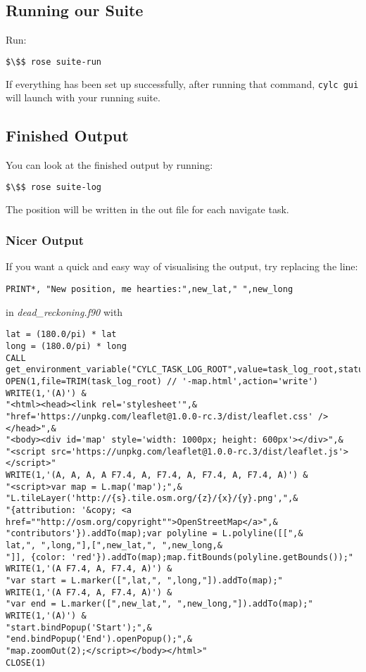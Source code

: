 \subsection{Running our Suite}

Run:

\begin{lstlisting}[mathescape, language=bash]
$\$$ rose suite-run
\end{lstlisting}

If everything has been set up successfully, after running that command, \lstinline{cylc gui} will launch with your running suite.

\subsection{Finished Output}

You can look at the finished output by running:

\begin{lstlisting}[mathescape, language=bash]
$\$$ rose suite-log
\end{lstlisting}

The position will be written in the out file for each navigate task.

\subsubsection{Nicer Output}

If you want a quick and easy way of visualising the output, try replacing the line:

\lstset{language=Fortran}
\begin{lstlisting}[columns=fullflexible]
PRINT*, "New position, me hearties:",new_lat," ",new_long
\end{lstlisting}

in {\em dead\_reckoning.f90} with

\lstset{language=Fortran}
\begin{lstlisting}[columns=fullflexible]
lat = (180.0/pi) * lat
long = (180.0/pi) * long
CALL get_environment_variable("CYLC_TASK_LOG_ROOT",value=task_log_root,status=code)
OPEN(1,file=TRIM(task_log_root) // '-map.html',action='write')
WRITE(1,'(A)') &
"<html><head><link rel='stylesheet'",&
"href='https://unpkg.com/leaflet@1.0.0-rc.3/dist/leaflet.css' /></head>",&
"<body><div id='map' style='width: 1000px; height: 600px'></div>",&
"<script src='https://unpkg.com/leaflet@1.0.0-rc.3/dist/leaflet.js'></script>"
WRITE(1,'(A, A, A, A F7.4, A, F7.4, A, F7.4, A, F7.4, A)') &
"<script>var map = L.map('map');",&
"L.tileLayer('http://{s}.tile.osm.org/{z}/{x}/{y}.png',",&
"{attribution: '&copy; <a href=""http://osm.org/copyright"">OpenStreetMap</a>",&
"contributors'}).addTo(map);var polyline = L.polyline([[",&
lat,", ",long,"],[",new_lat,", ",new_long,&
"]], {color: 'red'}).addTo(map);map.fitBounds(polyline.getBounds());"
WRITE(1,'(A F7.4, A, F7.4, A)') &
"var start = L.marker([",lat,", ",long,"]).addTo(map);"
WRITE(1,'(A F7.4, A, F7.4, A)') &
"var end = L.marker([",new_lat,", ",new_long,"]).addTo(map);"
WRITE(1,'(A)') &
"start.bindPopup('Start');",&
"end.bindPopup('End').openPopup();",&
"map.zoomOut(2);</script></body></html>"
CLOSE(1)
\end{lstlisting}

